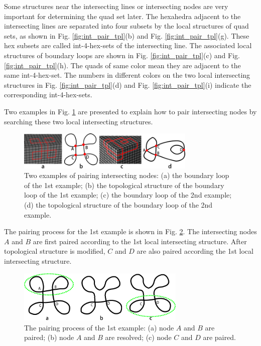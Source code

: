 \documentclass[final,5p,times,twocolumn]{elsarticle}
\begin{document}
Some structures near the intersecting lines or intersecting nodes are very important for determining the quad set later. The hexahedra adjacent to the intersecting lines are separated into four subsets by the local structures of quad sets, as shown in Fig. \ref{fig:int_pair_tpl}(b) and Fig. \ref{fig:int_pair_tpl}(g). These hex subsets are called int-4-hex-sets of the intersecting line. The associated local structures of boundary loops are shown in Fig. \ref{fig:int_pair_tpl}(c) and Fig. \ref{fig:int_pair_tpl}(h). The quads of same color mean they are adjacent to the same int-4-hex-set. The numbers in different colors on the two local intersecting structures in Fig. \ref{fig:int_pair_tpl}(d) and Fig. \ref{fig:int_pair_tpl}(i) indicate the corresponding int-4-hex-sets.

Two examples in Fig. \ref{fig:pair_int_exams} are presented to explain how to pair intersecting nodes by searching these two local intersecting structures.

\begin{figure}[htbp]
\begin{center}
\includegraphics[width=8.5cm]{pmatchexams.png}
\caption{Two examples of pairing intersecting nodes: (a) the boundary loop of the 1st example; (b) the topological structure of the boundary loop of the 1st example; (c) the boundary loop of the 2nd example; (d) the topological structure of the boundary loop of the 2nd example.}
\label{fig:pair_int_exams}
\end{center}
\end{figure}

The pairing process for the 1st example is shown in Fig. \ref{fig:pair_int_exam1_proc}. The intersecting nodes $A$ and $B$ are first paired according to the 1st local intersecting structure. After topological structure is modified, $C$ and $D$ are also paired according the 1st local intersecting structure.

\begin{figure}[htbp]
\begin{center}
\includegraphics[width=8cm]{pmexam1step.png}
\caption{The pairing process of the 1st example: (a) node $A$ and $B$ are paired; (b) node $A$ and $B$ are resolved; (c) node $C$ and $D$ are paired.}
\label{fig:pair_int_exam1_proc}
\end{center}
\end{figure}
\end{document}
